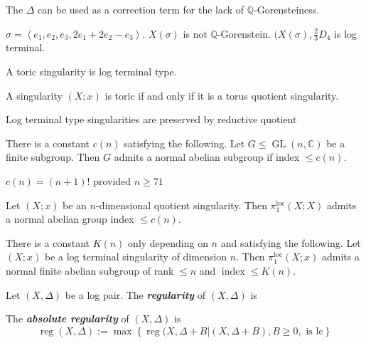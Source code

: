\begin{remark}
	The $\Delta$ can be used as a correction term for the lack of $\mathbb{Q}$-Gorensteiness.
\end{remark}

\begin{example}
	$\sigma=\left<e_{1},e_{2},e_{3},2e_{1}+2e_{2}-e_{3}\right> $. $X(\sigma)$ is not $\mathbb{Q}$-Gorenstein. $(X(\sigma),\frac{2}{3}D_{4}$ is log terminal.
\end{example}

\begin{thm}
	A toric singularity is log terminal type.
\end{thm}

\begin{thm}
	A singularity $(X;x)$ is toric if and only if it is a torus quotient singularity.
\end{thm}

\begin{thm}\leavevmode
	Log terminal type singularities are preserved by reductive quotient
\end{thm}

\begin{thm}[Jordan, 1870's]\leavevmode
	There is a constant $c(n)$ satisfying the following. Let $G\leq \operatorname{GL}(n,\mathbb{C})$ be a finite subgroup. Then $G$ admits a normal abelian subgroup if index $\leq c(n)$.
\end{thm}

\begin{thm}[Collins, 2010]\leavevmode
	$c(n)=(n+1)!$ provided $n\geq 71$
\end{thm}

\begin{coro}
	Let $(X;x)$ be an $n$-dimensional quotient singularity. Then $\pi_{1}^{\operatorname{loc}}(X;X)$ admits a normal abelian group index $\leq c(n)$.
\end{coro}

\begin{thm}\leavevmode
	There is a constant $K(n)$ only depending on $n$ and satisfying the following. Let $(X;x)$ be a log terminal singularity of dimension $n$. Then $\pi_{1}^{\operatorname{loc}}(X;x)$ admits a normal finite abelian subgroup of rank $\leq n$ and $\operatorname{index}\leq K(n)$.
\end{thm}

\begin{defn}
	Let $(X,\Delta)$ be a log pair. The \textit{\textbf{regularity}} of $(X,\Delta)$ is

	The \textit{\textbf{absolute regularity}} of $(X,\Delta)$ is
	\[\hat{\operatorname{reg}}(X,\Delta):=\operatorname{max}\left\{ \operatorname{reg}(X,\Delta +B|(X,\Delta +B), B\geq 0, \text{ is lc}  \right\} \]
\end{defn}

